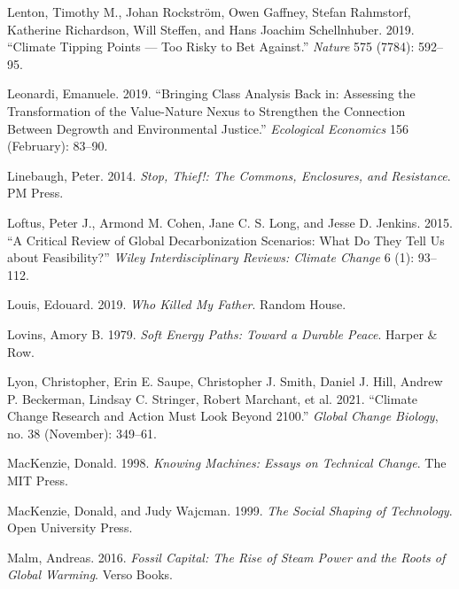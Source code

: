\documentclass[a4paper, nobind]{templates/ociamthesis}
\newlength{\cslhangindent}
\newenvironment{CSLReferences}[2] %
 {%
  \setlength{\parindent}{0pt}
  \ifodd #1
  \let\oldpar\par
  \def\par{\hangindent=\cslhangindent\oldpar}
  \fi
  \setlength{\parskip}{1mm}
  \setlength{\baselineskip}{6mm}
 }%
 {}
\begin{document}
\begin{CSLReferences}{1}{0}
\leavevmode{}%
Lenton, Timothy M., Johan Rockström, Owen Gaffney, Stefan Rahmstorf, Katherine Richardson, Will Steffen, and Hans Joachim Schellnhuber. 2019. {``Climate Tipping Points --- Too Risky to Bet Against.''} \emph{Nature} 575 (7784): 592--95.

\leavevmode{}%
Leonardi, Emanuele. 2019. {``Bringing {Class Analysis Back} in: {Assessing} the {Transformation} of the {Value-Nature Nexus} to {Strengthen} the {Connection Between Degrowth} and {Environmental Justice}.''} \emph{Ecological Economics} 156 (February): 83--90.

\leavevmode{}%
Linebaugh, Peter. 2014. \emph{Stop, {Thief}!: {The Commons}, {Enclosures}, and {Resistance}}. {PM Press}.

\leavevmode{}%
Loftus, Peter J., Armond M. Cohen, Jane C. S. Long, and Jesse D. Jenkins. 2015. {``A Critical Review of Global Decarbonization Scenarios: What Do They Tell Us about Feasibility?''} \emph{Wiley Interdisciplinary Reviews: Climate Change} 6 (1): 93--112.

\leavevmode{}%
Louis, Edouard. 2019. \emph{Who {Killed My Father}}. {Random House}.

\leavevmode{}%
Lovins, Amory B. 1979. \emph{Soft {Energy Paths}: {Toward} a {Durable Peace}}. {Harper \& Row}.

\leavevmode{}%
Lyon, Christopher, Erin E. Saupe, Christopher J. Smith, Daniel J. Hill, Andrew P. Beckerman, Lindsay C. Stringer, Robert Marchant, et al. 2021. {``Climate Change Research and Action Must Look Beyond 2100.''} \emph{Global Change Biology}, no. 38 (November): 349--61.

\leavevmode{}%
MacKenzie, Donald. 1998. \emph{Knowing {Machines}: {Essays} on {Technical Change}}. {The MIT Press}.

\leavevmode{}%
MacKenzie, Donald, and Judy Wajcman. 1999. \emph{The Social Shaping of Technology}. {Open University Press}.

\leavevmode{}%
Malm, Andreas. 2016. \emph{Fossil {Capital}: {The Rise} of {Steam Power} and the {Roots} of {Global Warming}}. {Verso Books}.


\end{CSLReferences}
\end{document}
